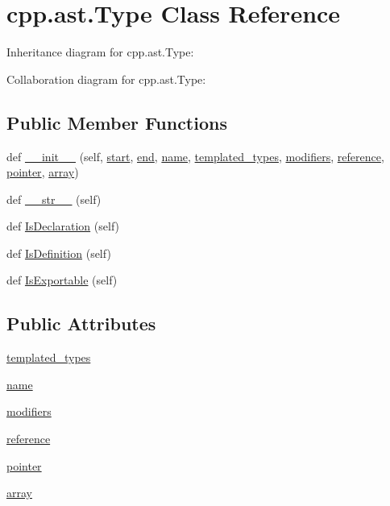 \hypertarget{classcpp_1_1ast_1_1_type}{}\section{cpp.\+ast.\+Type Class Reference}
\label{classcpp_1_1ast_1_1_type}


Inheritance diagram for cpp.\+ast.\+Type\+:


Collaboration diagram for cpp.\+ast.\+Type\+:
\subsection*{Public Member Functions}
\begin{DoxyCompactItemize}
\item 
def \hyperlink{classcpp_1_1ast_1_1_type_adc20d88db721b5d7b513c08a4d6753c9}{\+\_\+\+\_\+init\+\_\+\+\_\+} (self, \hyperlink{classcpp_1_1ast_1_1_node_a7b2aa97e6a049bb1a93aea48c48f1f44}{start}, \hyperlink{classcpp_1_1ast_1_1_node_a3c5e5246ccf619df28eca02e29d69647}{end}, \hyperlink{classcpp_1_1ast_1_1_type_a5905424e2b65f0215b6ecd73b4bfe24c}{name}, \hyperlink{classcpp_1_1ast_1_1_type_a7c38fcafa00dae6ee22bab783086a1a7}{templated\+\_\+types}, \hyperlink{classcpp_1_1ast_1_1_type_a0effa0a077eda79943e881955b4c51a5}{modifiers}, \hyperlink{classcpp_1_1ast_1_1_type_a8d2cddd631397c3bf86198cc420d584d}{reference}, \hyperlink{classcpp_1_1ast_1_1_type_a37234bb68915c93894cbc8e366c1eaad}{pointer}, \hyperlink{classcpp_1_1ast_1_1_type_a1fd0493e82da315bcb4c02b0cf2133a3}{array})
\item 
def \hyperlink{classcpp_1_1ast_1_1_type_a1a10eff21f6150b7e14bde3788fa069b}{\+\_\+\+\_\+str\+\_\+\+\_\+} (self)
\item 
def \hyperlink{classcpp_1_1ast_1_1_type_a590071a2bce7ea5140d7eb86c90f63bf}{Is\+Declaration} (self)
\item 
def \hyperlink{classcpp_1_1ast_1_1_type_aedff25dc3736e83388742e55fe29159b}{Is\+Definition} (self)
\item 
def \hyperlink{classcpp_1_1ast_1_1_type_a80dce781581c03e550ce51a9a33ca158}{Is\+Exportable} (self)
\end{DoxyCompactItemize}
\subsection*{Public Attributes}
\begin{DoxyCompactItemize}
\item 
\hyperlink{classcpp_1_1ast_1_1_type_a7c38fcafa00dae6ee22bab783086a1a7}{templated\+\_\+types}
\item 
\hyperlink{classcpp_1_1ast_1_1_type_a5905424e2b65f0215b6ecd73b4bfe24c}{name}
\item 
\hyperlink{classcpp_1_1ast_1_1_type_a0effa0a077eda79943e881955b4c51a5}{modifiers}
\item 
\hyperlink{classcpp_1_1ast_1_1_type_a8d2cddd631397c3bf86198cc420d584d}{reference}
\item 
\hyperlink{classcpp_1_1ast_1_1_type_a37234bb68915c93894cbc8e366c1eaad}{pointer}
\item 
\hyperlink{classcpp_1_1ast_1_1_type_a1fd0493e82da315bcb4c02b0cf2133a3}{array}
\end{DoxyCompactItemize}


